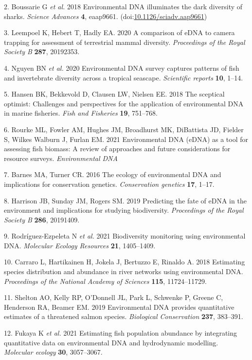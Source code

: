 \documentclass[
]{article}
\begin{document}
2. Boussarie G \emph{et al.} 2018 Environmental DNA illuminates the dark
diversity of sharks. \emph{Science Advances} \textbf{4}, eaap9661.
(doi:\href{https://doi.org/10.1126/sciadv.aap9661}{10.1126/sciadv.aap9661})

3. Leempoel K, Hebert T, Hadly EA. 2020 A comparison of eDNA to camera
trapping for assessment of terrestrial mammal diversity.
\emph{Proceedings of the Royal Society B} \textbf{287}, 20192353.

4. Nguyen BN \emph{et al.} 2020 Environmental DNA survey captures
patterns of fish and invertebrate diversity across a tropical seascape.
\emph{Scientific reports} \textbf{10}, 1--14.

5. Hansen BK, Bekkevold D, Clausen LW, Nielsen EE. 2018 The sceptical
optimist: Challenges and perspectives for the application of
environmental DNA in marine fisheries. \emph{Fish and Fisheries}
\textbf{19}, 751--768.

6. Rourke ML, Fowler AM, Hughes JM, Broadhurst MK, DiBattista JD,
Fielder S, Wilkes Walburn J, Furlan EM. 2021 Environmental DNA (eDNA) as
a tool for assessing fish biomass: A review of approaches and future
considerations for resource surveys. \emph{Environmental DNA}

7. Barnes MA, Turner CR. 2016 The ecology of environmental DNA and
implications for conservation genetics. \emph{Conservation genetics}
\textbf{17}, 1--17.

8. Harrison JB, Sunday JM, Rogers SM. 2019 Predicting the fate of eDNA
in the environment and implications for studying biodiversity.
\emph{Proceedings of the Royal Society B} \textbf{286}, 20191409.

9. Rodr\'{i}guez-Ezpeleta N \emph{et al.} 2021 Biodiversity monitoring using
environmental DNA. \emph{Molecular Ecology Resources} \textbf{21},
1405--1409.

10. Carraro L, Hartikainen H, Jokela J, Bertuzzo E, Rinaldo A. 2018
Estimating species distribution and abundance in river networks using
environmental DNA. \emph{Proceedings of the National Academy of
Sciences} \textbf{115}, 11724--11729.

11. Shelton AO, Kelly RP, O'Donnell JL, Park L, Schwenke P, Greene C,
Henderson RA, Beamer EM. 2019 Environmental DNA provides quantitative
estimates of a threatened salmon species. \emph{Biological Conservation}
\textbf{237}, 383--391.

12. Fukaya K \emph{et al.} 2021 Estimating fish population abundance by
integrating quantitative data on environmental DNA and hydrodynamic
modelling. \emph{Molecular ecology} \textbf{30}, 3057--3067.
\end{document}
